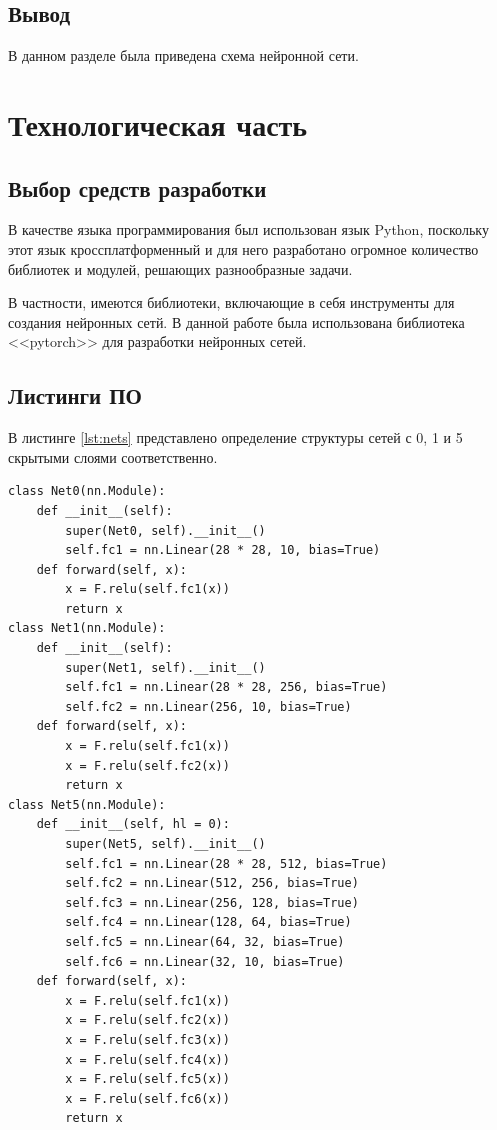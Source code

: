 \documentclass[12pt]{report}
\begin{document}
\section*{Вывод}
В данном разделе была приведена схема нейронной сети.

\chapter{Технологическая часть}

\section{Выбор средств разработки}
В качестве языка программирования был использован язык Python, поскольку этот язык кроссплатформенный и для него разработано огромное количество библиотек и модулей, решающих разнообразные задачи. 

В частности, имеются библиотеки, включающие в себя инструменты для создания нейронных сетй. В данной работе была использована библиотека <<pytorch>> \cite{bib:pytorch} для разработки нейронных сетей.

\section{Листинги ПО}

В листинге \ref{lst:nets} представлено определение структуры сетей с 0, 1 и 5 скрытыми слоями соответственно.

\begin{lstlisting}[label=lst:nets,caption=Определение структуры сетей]
class Net0(nn.Module):
    def __init__(self):
        super(Net0, self).__init__()
        self.fc1 = nn.Linear(28 * 28, 10, bias=True)
    def forward(self, x):
        x = F.relu(self.fc1(x))
        return x
class Net1(nn.Module):
    def __init__(self):
        super(Net1, self).__init__()
        self.fc1 = nn.Linear(28 * 28, 256, bias=True)
        self.fc2 = nn.Linear(256, 10, bias=True)
    def forward(self, x):
        x = F.relu(self.fc1(x))
        x = F.relu(self.fc2(x))
        return x
class Net5(nn.Module):
    def __init__(self, hl = 0):
        super(Net5, self).__init__()
        self.fc1 = nn.Linear(28 * 28, 512, bias=True)
        self.fc2 = nn.Linear(512, 256, bias=True)
        self.fc3 = nn.Linear(256, 128, bias=True)
        self.fc4 = nn.Linear(128, 64, bias=True)
        self.fc5 = nn.Linear(64, 32, bias=True)
        self.fc6 = nn.Linear(32, 10, bias=True)
    def forward(self, x):
        x = F.relu(self.fc1(x))
        x = F.relu(self.fc2(x))
        x = F.relu(self.fc3(x))
        x = F.relu(self.fc4(x))
        x = F.relu(self.fc5(x))
        x = F.relu(self.fc6(x))
        return x
\end{lstlisting}
\end{document}
